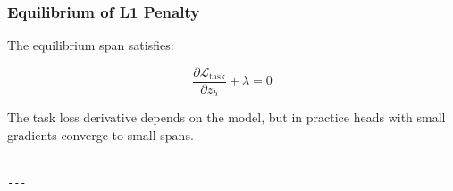 \subsubsection{Equilibrium of L1 Penalty}

The equilibrium span satisfies:

\[
\frac{\partial \mathcal{L}_\text{task}}{\partial z_h} + \lambda = 0
\]

The task loss derivative depends on the model, but in practice heads with 
small gradients converge to small spans.
\begin{lstlisting}

---
\end{lstlisting}